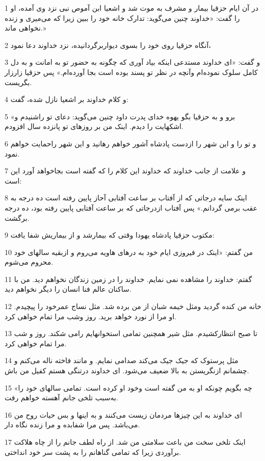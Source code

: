 \par 1 در آن ایام حزقیا بیمار و مشرف به موت شد و اشعیا ابن آموص نبی نزد وی آمده، او را گفت: «خداوند چنین می‌گوید: تدارک خانه خود را ببین زیرا که می‌میری و زنده نخواهی ماند.»
\par 2 آنگاه حزقیا روی خود را بسوی دیواربرگردانیده، نزد خداوند دعا نمود،
\par 3 و گفت: «ای خداوند مستدعی اینکه بیاد آوری که چگونه به حضور تو به امانت و به دل کامل سلوک نموده‌ام وآنچه در نظر تو پسند بوده است بجا آورده‌ام.» پس حزقیا زار‌زار بگریست.
\par 4 و کلام خداوند بر اشعیا نازل شده، گفت:
\par 5 «برو و به حزقیا بگو یهوه خدای پدرت داود چنین می‌گوید: دعای تو راشنیدم و اشکهایت را دیدم. اینک من بر روزهای تو پانزده سال افزودم.
\par 6 و تو را و این شهر را ازدست پادشاه آشور خواهم رهانید و این شهر راحمایت خواهم نمود.
\par 7 و علامت از جانب خداوند که خداوند این کلام را که گفته است بجاخواهد آورد این است:
\par 8 اینک سایه درجاتی که از آفتاب بر ساعت آفتابی آحاز پایین رفته است ده درجه به عقب برمی گردانم.» پس آفتاب ازدرجاتی که بر ساعت آفتابی پایین رفته بود، ده درجه برگشت.
\par 9 مکتوب حزقیا پادشاه یهودا وقتی که بیمارشد و از بیماریش شفا یافت:
\par 10 من گفتم: «اینک در فیروزی ایام خود به درهای هاویه می‌روم و ازبقیه سالهای خود محروم می‌شوم.
\par 11 گفتم: خداوند را مشاهده نمی نمایم. خداوند را در زمین زندگان نخواهم دید. من با ساکنان عالم فنا انسان را دیگر نخواهم دید.
\par 12 خانه من کنده گردید ومثل خیمه شبان از من برده شد. مثل نساج عمرخود را پیچیدم. او مرا از نورد خواهد برید. روز وشب مرا تمام خواهی کرد.
\par 13 تا صبح انتظارکشیدم. مثل شیر همچنین تمامی استخوانهایم رامی شکند. روز و شب مرا تمام خواهی کرد.
\par 14 مثل پرستوک که جیک جیک می‌کند صدامی نمایم. و مانند فاخته ناله می‌کنم و چشمانم ازنگریستن به بالا ضعیف می‌شود. ای خداوند درتنگی هستم کفیل من باش.
\par 15 «چه بگویم چونکه او به من گفته است وخود او کرده است. تمامی سالهای خود را به‌سبب تلخی جانم آهسته خواهم رفت.
\par 16 ‌ای خداوند به این چیزها مردمان زیست می‌کنند و به اینها و بس حیات روح من می‌باشد. پس مرا شفابده و مرا زنده نگاه دار.
\par 17 اینک تلخی سخت من باعث سلامتی من شد. از راه لطف جانم را از چاه هلاکت برآوردی زیرا که تمامی گناهانم را به پشت سر خود انداختی.
